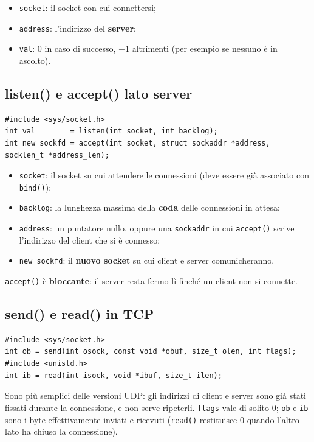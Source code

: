 \begin{itemize}
    \item \texttt{socket}: il socket con cui connettersi;
    \item \texttt{address}: l'indirizzo del \textbf{server};
    \item \texttt{val}: 0 in caso di successo, $-1$ altrimenti (per esempio se nessuno è in ascolto).
\end{itemize}

\subsection{listen() e accept() lato server}

\begin{lstlisting}[language={[POSIX]C}]
#include <sys/socket.h>
int val        = listen(int socket, int backlog);
int new_sockfd = accept(int socket, struct sockaddr *address, socklen_t *address_len);
\end{lstlisting}

\begin{itemize}
    \item \texttt{socket}: il socket su cui attendere le connessioni (deve essere già associato con \texttt{bind()});
    \item \texttt{backlog}: la lunghezza massima della \textbf{coda} delle connessioni in attesa;
    \item \texttt{address}: un puntatore nullo, oppure una \texttt{sockaddr} in cui \texttt{accept()} scrive
          l'indirizzo del client che si è connesso;
    \item \texttt{new\_sockfd}: il \textbf{nuovo socket} su cui client e server comunicheranno.
\end{itemize}

\texttt{accept()} è \textbf{bloccante}: il server resta fermo lì finché un client non si connette.

\subsection{send() e read() in TCP}

\begin{lstlisting}[language={[POSIX]C}]
#include <sys/socket.h>
int ob = send(int osock, const void *obuf, size_t olen, int flags);
#include <unistd.h>
int ib = read(int isock, void *ibuf, size_t ilen);
\end{lstlisting}

Sono più semplici delle versioni UDP: gli indirizzi di client e server sono già stati fissati durante la
connessione, e non serve ripeterli. \texttt{flags} vale di solito 0; \texttt{ob} e \texttt{ib} sono i byte
effettivamente inviati e ricevuti (\texttt{read()} restituisce 0 quando l'altro lato ha chiuso la connessione).

